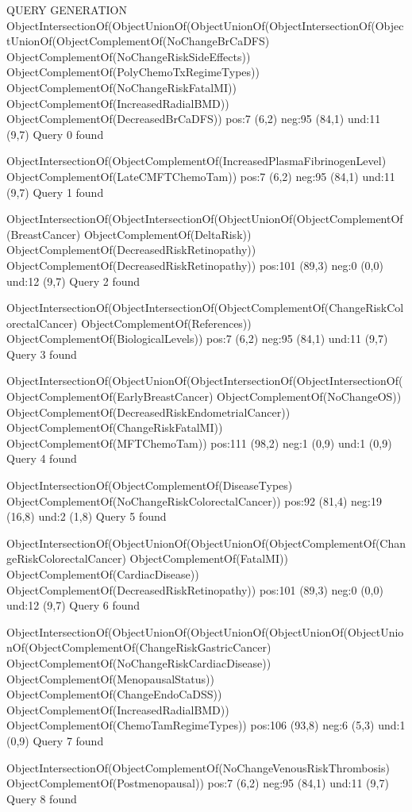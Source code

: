 QUERY GENERATION
ObjectIntersectionOf(ObjectUnionOf(ObjectUnionOf(ObjectIntersectionOf(ObjectUnionOf(ObjectComplementOf(NoChangeBrCaDFS) ObjectComplementOf(NoChangeRiskSideEffects)) ObjectComplementOf(PolyChemoTxRegimeTypes)) ObjectComplementOf(NoChangeRiskFatalMI)) ObjectComplementOf(IncreasedRadialBMD)) ObjectComplementOf(DecreasedBrCaDFS))
pos:7 (6,2)        neg:95 (84,1)		 		und:11 (9,7)
Query 0 found

ObjectIntersectionOf(ObjectComplementOf(IncreasedPlasmaFibrinogenLevel) ObjectComplementOf(LateCMFTChemoTam))
pos:7 (6,2)        neg:95 (84,1)		 		und:11 (9,7)
Query 1 found

ObjectIntersectionOf(ObjectIntersectionOf(ObjectUnionOf(ObjectComplementOf(BreastCancer) ObjectComplementOf(DeltaRisk)) ObjectComplementOf(DecreasedRiskRetinopathy)) ObjectComplementOf(DecreasedRiskRetinopathy))
pos:101 (89,3)		 neg:0 (0,0)		 und:12 (9,7)
Query 2 found

ObjectIntersectionOf(ObjectIntersectionOf(ObjectComplementOf(ChangeRiskColorectalCancer) ObjectComplementOf(References)) ObjectComplementOf(BiologicalLevels))
pos:7 (6,2)        neg:95 (84,1)		 		und:11 (9,7)
Query 3 found

ObjectIntersectionOf(ObjectUnionOf(ObjectIntersectionOf(ObjectIntersectionOf(ObjectComplementOf(EarlyBreastCancer) ObjectComplementOf(NoChangeOS)) ObjectComplementOf(DecreasedRiskEndometrialCancer)) ObjectComplementOf(ChangeRiskFatalMI)) ObjectComplementOf(MFTChemoTam))
pos:111 (98,2)		 neg:1 (0,9)		 und:1 (0,9)
Query 4 found

ObjectIntersectionOf(ObjectComplementOf(DiseaseTypes) ObjectComplementOf(NoChangeRiskColorectalCancer))
pos:92 (81,4)		 neg:19 (16,8)		 und:2 (1,8)
Query 5 found

ObjectIntersectionOf(ObjectUnionOf(ObjectUnionOf(ObjectComplementOf(ChangeRiskColorectalCancer) ObjectComplementOf(FatalMI)) ObjectComplementOf(CardiacDisease)) ObjectComplementOf(DecreasedRiskRetinopathy))
pos:101 (89,3)		 neg:0 (0,0)		 und:12 (9,7)
Query 6 found

ObjectIntersectionOf(ObjectUnionOf(ObjectUnionOf(ObjectUnionOf(ObjectUnionOf(ObjectComplementOf(ChangeRiskGastricCancer) ObjectComplementOf(NoChangeRiskCardiacDisease)) ObjectComplementOf(MenopausalStatus)) ObjectComplementOf(ChangeEndoCaDSS)) ObjectComplementOf(IncreasedRadialBMD)) ObjectComplementOf(ChemoTamRegimeTypes))
pos:106 (93,8)		 neg:6 (5,3)		 und:1 (0,9)
Query 7 found

ObjectIntersectionOf(ObjectComplementOf(NoChangeVenousRiskThrombosis) ObjectComplementOf(Postmenopausal))
pos:7 (6,2)        neg:95 (84,1)		 		und:11 (9,7)
Query 8 found


